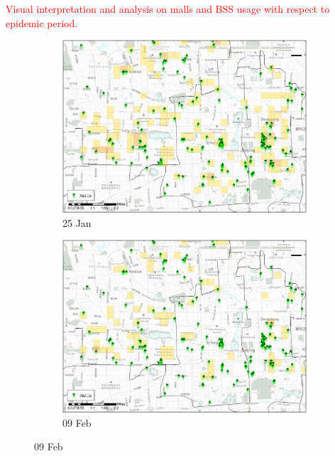\documentclass[preprints,ijgi,submit,moreauthors]{Definitions/mdpi}
\begin{document}
\textcolor{red}{Visual interpretation and analysis on malls and BSS usage with respect to epidemic period.}
\begin{figure}[H]
    \centering
    \begin{subfigure}{.45\textwidth}
        \includegraphics[width=\textwidth]{Figures/Relation_with_POIs/POI_mallsD2020_01_25.eps}
        \caption{25 Jan}
    \end{subfigure}
    \begin{subfigure}{.45\textwidth}
        \includegraphics[width=\textwidth]{Figures/Relation_with_POIs/POI_mallsD2020_02_09.eps}
        \caption{09 Feb}
    \end{subfigure}


\end{figure}
\end{document}
